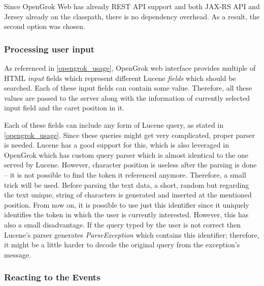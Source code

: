 Since OpenGrok Web has already REST API support and both JAX-RS API and Jersey already on the classpath,
there is no dependency overhead. As a result, the second option was chosen.

\subsubsection{Processing user input}
\label{processing_user_input}
As referenced in \ref{opengrok_usage}, OpenGrok web interface provides multiple of HTML \textit{input} fields which
represent different Lucene \textit{fields} which should be searched. Each of these input fields can contain some value.
Therefore, all these values are passed to the server along with the information of currently selected input field and
the caret position in it.

Each of these fields can include any form of Lucene query, as stated in \ref{opengrok_usage}. Since these queries might
get very complicated, proper parser is needed. Lucene has a good support for this, which is also leveraged in OpenGrok
which has custom query parser which is almost identical to the one served by Lucene. However, character position is
useless after the parsing is done – it is not possible to find the token it referenced anymore. Therefore, a small
trick will be used. Before parsing the text data, a short, random but regarding the text unique, string of characters
is generated and inserted at the mentioned position. From now on, it is possible to use just this identifier since it
uniquely identifies the token in which the user is currently interested. However, this has also a small disadvantage.
If the query typed by the user is not correct then Lucene's parser generates \textit{ParseException} which contains
this identifier; therefore, it might be a little harder to decode the original query from the exception's message.

\subsubsection{Reacting to the Events}

